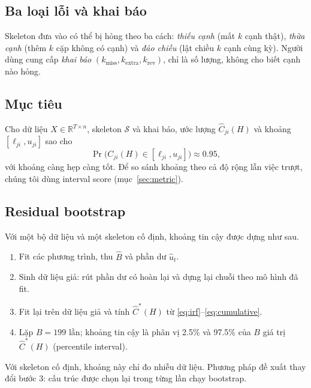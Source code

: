 \subsection{Ba loại lỗi và khai báo}
Skeleton đưa vào có thể bị hỏng theo ba cách: \emph{thiếu cạnh} (mất $k$ cạnh thật), \emph{thừa cạnh} (thêm $k$ cặp không có cạnh) và \emph{đảo chiều} (lật chiều $k$ cạnh cùng kỳ). Người dùng cung cấp \emph{khai báo} $(k_{\text{miss}},k_{\text{extra}},k_{\text{rev}})$, chỉ là số lượng, không cho biết cạnh nào hỏng.

\subsection{Mục tiêu}
Cho dữ liệu $X\in\mathbb R^{T\times n}$, skeleton $\mathcal S$ và khai báo, ước lượng $\hat C_{ji}(H)$ và khoảng $[\ell_{ji},u_{ji}]$ sao cho
\[
\Pr\bigl(C_{ji}(H)\in[\ell_{ji},u_{ji}]\bigr)\approx 0.95,
\]
với khoảng càng hẹp càng tốt. Để so sánh khoảng theo cả độ rộng lẫn việc trượt, chúng tôi dùng interval score (mục~\ref{sec:metric}).

\subsection{Residual bootstrap}\label{sec:bootstrap}
Với một bộ dữ liệu và một skeleton cố định, khoảng tin cậy được dựng như sau.
\begin{enumerate}
  \item Fit các phương trình, thu $\hat B$ và phần dư $\hat u_t$.
  \item Sinh dữ liệu giả: rút phần dư có hoàn lại và dựng lại chuỗi theo mô hình đã fit.
  \item Fit lại trên dữ liệu giả và tính $\hat C^{*}(H)$ từ \eqref{eq:irf}--\eqref{eq:cumulative}.
  \item Lặp $B=199$ lần; khoảng tin cậy là phân vị 2.5\% và 97.5\% của $B$ giá trị $\hat C^*(H)$ (percentile interval).
\end{enumerate}
Với skeleton cố định, khoảng này chỉ đo nhiễu dữ liệu. Phương pháp đề xuất thay đổi bước 3: cấu trúc được chọn lại trong từng lần chạy bootstrap.
